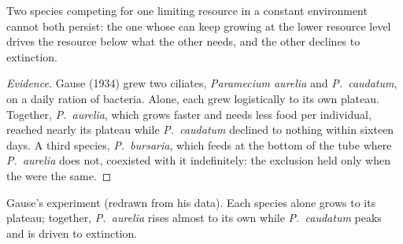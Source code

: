 \begin{proposition}\label{prop:b1:species-interactions:gause}
Two species competing for one limiting resource in a constant
environment cannot both persist: the one whose  can keep
growing at the lower resource level drives the resource below what
the other needs, and the other declines to extinction.
\end{proposition}
\begin{proof}[Evidence]
Gause (1934) grew two ciliates, \emph{Paramecium aurelia} and
\emph{P.~caudatum}, on a daily ration of bacteria. Alone, each grew
logistically to its own plateau. Together, \emph{P.~aurelia}, which
grows faster and needs less food per individual, reached nearly its
plateau while \emph{P.~caudatum} declined to nothing within sixteen
days. A third species, \emph{P.~bursaria}, which feeds at the bottom
of the tube where \emph{P.~aurelia} does not, coexisted with it
indefinitely: the exclusion held only when the  were the same.
\end{proof}

\begin{omfigure}

{\small Gause's  experiment (redrawn from his data).
Each species alone grows to its plateau; together, \emph{P.~aurelia}
rises almost to its own while \emph{P.~caudatum} peaks and is driven
to extinction.}
\end{omfigure}

